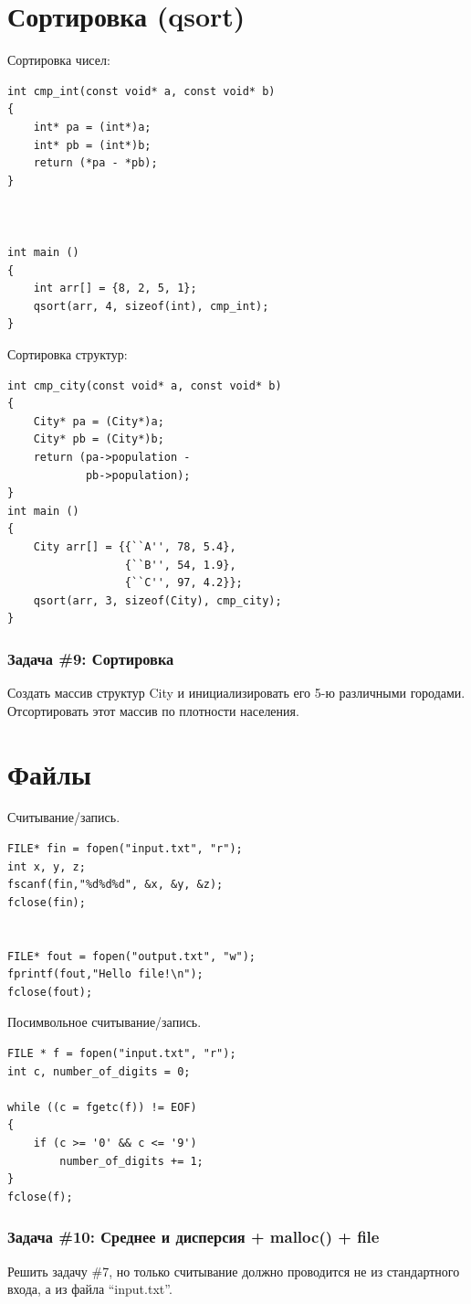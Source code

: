 \documentclass{article}
\begin{document}
\section*{Сортировка (qsort)}
\begin{multicols}{2}
Сортировка чисел:
\begin{lstlisting}
int cmp_int(const void* a, const void* b)
{
    int* pa = (int*)a;
    int* pb = (int*)b;
    return (*pa - *pb);
}



int main ()
{
    int arr[] = {8, 2, 5, 1};
    qsort(arr, 4, sizeof(int), cmp_int);
}
\end{lstlisting}
Сортировка структур:
\begin{lstlisting}
int cmp_city(const void* a, const void* b)
{
    City* pa = (City*)a;
    City* pb = (City*)b;
    return (pa->population -
            pb->population);
}
int main ()
{
    City arr[] = {{``A'', 78, 5.4}, 
                  {``B'', 54, 1.9}, 
                  {``C'', 97, 4.2}};
    qsort(arr, 3, sizeof(City), cmp_city);
}
\end{lstlisting}
\end{multicols}
\subsubsection*{\Squarepipe \quad Задача \#9: Сортировка}
Создать массив структур City и инициализировать его 5-ю различными городами. Отсортировать этот массив по плотности населения.
\section*{Файлы}
\begin{multicols}{2}
Считывание/запись.
\begin{lstlisting}
FILE* fin = fopen("input.txt", "r");
int x, y, z;
fscanf(fin,"%d%d%d", &x, &y, &z);
fclose(fin);


FILE* fout = fopen("output.txt", "w");
fprintf(fout,"Hello file!\n");
fclose(fout);
\end{lstlisting}
Посимвольное считывание/запись.
\begin{lstlisting}
FILE * f = fopen("input.txt", "r");
int c, number_of_digits = 0;

while ((c = fgetc(f)) != EOF)
{
    if (c >= '0' && c <= '9')
        number_of_digits += 1;
}
fclose(f);
\end{lstlisting}
\end{multicols}
\subsubsection*{\Squarepipe \quad Задача \#10: Среднее и дисперсия + malloc() + file}
Решить задачу \#7, но только считывание должно проводится не из стандартного входа, а из файла ``input.txt''.
\end{document}
